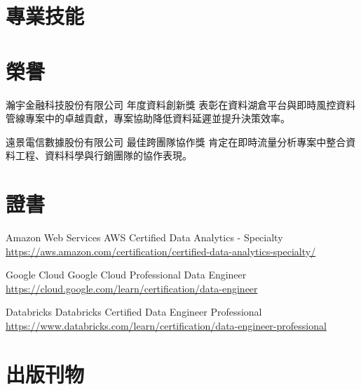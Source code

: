 \documentclass[a4paper, serif, 10pt]{moderncv}
\begin{document}
\section{專業技能}

\section{榮譽}

        {瀚宇金融科技股份有限公司}
        {年度資料創新獎}
        {}
        {}
        {表彰在資料湖倉平台與即時風控資料管線專案中的卓越貢獻，專案協助降低資料延遲並提升決策效率。}

        {遠景電信數據股份有限公司}
        {最佳跨團隊協作獎}
        {}
        {}
        {肯定在即時流量分析專案中整合資料工程、資料科學與行銷團隊的協作表現。}
\section{證書}

        {Amazon Web Services}
        {AWS Certified Data Analytics - Specialty}
        {\url{https://aws.amazon.com/certification/certified-data-analytics-specialty/}}
        {}
        {}

        {Google Cloud}
        {Google Cloud Professional Data Engineer}
        {\url{https://cloud.google.com/learn/certification/data-engineer}}
        {}
        {}

        {Databricks}
        {Databricks Certified Data Engineer Professional}
        {\url{https://www.databricks.com/learn/certification/data-engineer-professional}}
        {}
        {}
\section{出版刊物}
\end{document}
